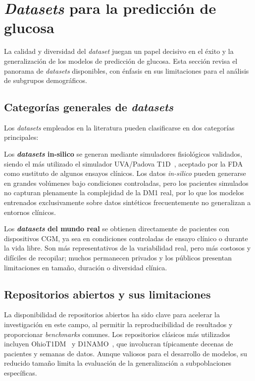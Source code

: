 \section{\emph{Datasets} para la predicción de glucosa}
\label{sec:datasets_literatura}

La calidad y diversidad del \emph{dataset} juegan un papel decisivo en el éxito y la generalización de los modelos de predicción de glucosa. Esta sección revisa el panorama de \emph{datasets} disponibles, con énfasis en sus limitaciones para el análisis de subgrupos demográficos.

\subsection{Categorías generales de \emph{datasets}}
\label{subsec:categorias_datasets}

Los \emph{datasets} empleados en la literatura pueden clasificarse en dos categorías principales:

Los \textbf{\emph{datasets} in-silico} se generan mediante simuladores fisiológicos validados, siendo el más utilizado el simulador UVA/Padova T1D~\cite{man2014uva}, aceptado por la FDA como sustituto de algunos ensayos clínicos. Los datos \emph{in-silico} pueden generarse en grandes volúmenes bajo condiciones controladas, pero los pacientes simulados no capturan plenamente la complejidad de la DM1 real, por lo que los modelos entrenados exclusivamente sobre datos sintéticos frecuentemente no generalizan a entornos clínicos.

Los \textbf{\emph{datasets} del mundo real} se obtienen directamente de pacientes con dispositivos CGM, ya sea en condiciones controladas de ensayo clínico o durante la vida libre. Son más representativos de la variabilidad real, pero más costosos y difíciles de recopilar; muchos permanecen privados y los públicos presentan limitaciones en tamaño, duración o diversidad clínica.

\subsection{Repositorios abiertos y sus limitaciones}
\label{subsec:repositorios_limitaciones}

La disponibilidad de repositorios abiertos ha sido clave para acelerar la investigación en este campo, al permitir la reproducibilidad de resultados y proporcionar \emph{benchmarks} comunes. Los repositorios clásicos más utilizados incluyen OhioT1DM~\cite{marling2020ohiot1dm} y D1NAMO~\cite{dubosson2018d1namo}, que involucran típicamente decenas de pacientes y semanas de datos. Aunque valiosos para el desarrollo de modelos, su reducido tamaño limita la evaluación de la generalización a subpoblaciones específicas.

